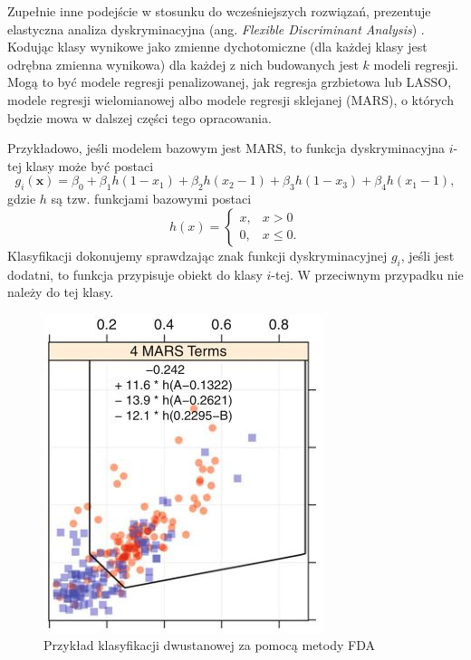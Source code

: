 \documentclass[]{book}
\theoremstyle{plain}
\theoremstyle{definition}
\theoremstyle{definition}
\theoremstyle{definition}
\theoremstyle{definition}
\theoremstyle{remark}
\begin{document}
Zupełnie inne podejście w stosunku do wcześniejszych rozwiązań, prezentuje elastyczna analiza dyskryminacyjna (ang. \emph{Flexible Discriminant Analysis}) . Kodując klasy wynikowe jako zmienne dychotomiczne (dla każdej klasy jest odrębna zmienna wynikowa) dla każdej z nich budowanych jest \(k\) modeli regresji. Mogą to być modele regresji penalizowanej, jak regresja grzbietowa lub LASSO, modele regresji wielomianowej albo modele regresji sklejanej (MARS), o których będzie mowa w dalszej części tego opracowania.

Przykładowo, jeśli modelem bazowym jest MARS, to funkcja dyskryminacyjna \(i\)-tej klasy może być postaci
\begin{equation}
    g_i(\boldsymbol x)=\beta_0+\beta_1h(1-x_1)+\beta_2h(x_2-1)+\beta_3h(1-x_3)+\beta_4h(x_1-1),
\end{equation}
gdzie \(h\) są tzw. funkcjami bazowymi postaci
\begin{equation}
    h(x)= \begin{cases}
        x, & x> 0\\
        0, & x\leq 0.
    \end{cases}
\end{equation}
Klasyfikacji dokonujemy sprawdzając znak funkcji dyskryminacyjnej \(g_i\), jeśli jest dodatni, to funkcja przypisuje obiekt do klasy \(i\)-tej. W przeciwnym przypadku nie należy do tej klasy.

\begin{figure}

{\centering \includegraphics{images/fda} 

}

\caption{Przykład klasyfikacji dwustanowej za pomocą metody FDA}\label{fig:fda}
\end{figure}
\end{document}
